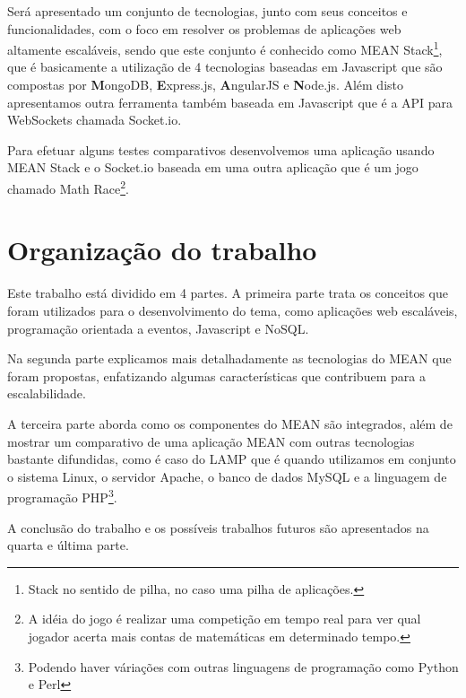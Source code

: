 Será apresentado um conjunto de tecnologias, junto com seus conceitos e funcionalidades, com o foco em resolver os problemas de aplicações web altamente escaláveis, sendo que este conjunto é conhecido como MEAN Stack\footnote{Stack no sentido de pilha, no caso uma pilha de aplicações.}, que é basicamente a utilização de 4 tecnologias baseadas em Javascript que são compostas por \textbf{M}ongoDB, \textbf{E}xpress.js, \textbf{A}ngularJS e \textbf{N}ode.js. Além disto apresentamos outra ferramenta também baseada em Javascript que é a API para WebSockets chamada Socket.io.

Para efetuar alguns testes comparativos desenvolvemos uma aplicação usando MEAN Stack e o Socket.io  baseada em uma outra aplicação que é um jogo chamado Math Race\footnote{A idéia do jogo é realizar uma competição em tempo real para ver qual jogador acerta mais contas de matemáticas em determinado tempo.}.


\section{Organização do trabalho}

Este trabalho está dividido em 4 partes. A primeira parte trata os conceitos que foram utilizados para o desenvolvimento do tema, como aplicações web escaláveis, programação orientada a eventos, Javascript e NoSQL. 

Na segunda parte explicamos mais detalhadamente as tecnologias do MEAN que foram propostas, enfatizando algumas características que contribuem para a escalabilidade.

A terceira parte aborda como os componentes do MEAN são integrados, além de  mostrar um comparativo de uma aplicação MEAN com outras tecnologias bastante difundidas, como é caso do LAMP que é quando utilizamos em conjunto o sistema Linux, o servidor Apache, o banco de dados MySQL e a linguagem de programação PHP\footnote{Podendo haver váriações com outras linguagens de programação como Python e Perl}.

A conclusão do trabalho e os possíveis trabalhos futuros são apresentados na quarta e última parte.